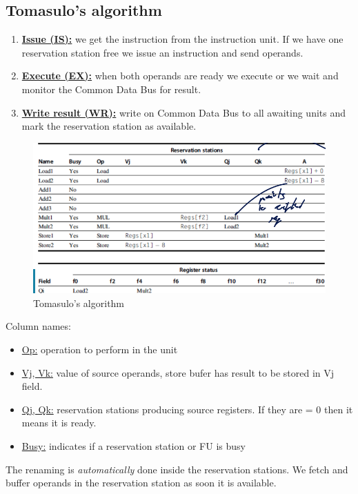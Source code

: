 \documentclass{report}
\begin{document}
\subsection{Tomasulo's algorithm}

\begin{enumerate}
    \item \underline{\textbf{Issue (IS):}} we get the instruction from the instruction unit. If we have one reservation station free we issue an instruction and send operands.
    \item \underline{\textbf{Execute (EX):}} when both operands are ready we execute or we wait and monitor the Common Data Bus for result.
    \item \underline{\textbf{Write result (WR):}} write on Common Data Bus to all awaiting  units and mark the reservation station as available.
\end{enumerate}

\begin{figure}[H]
    \centering
    \includegraphics[width=0.75\linewidth]{tomasulo_algo.png}
    \caption{Tomasulo's algorithm}
    \label{fig:tomasulo-label}
\end{figure}

Column names:

\begin{itemize}
    \item \underline{Op:} operation to perform in the unit
    \item \underline{Vj, Vk:} value of source operands, store bufer has result to be stored in Vj field.
    \item \underline{Qj, Qk:} reservation stations producing source registers. If they are = 0 then it means it is ready.
    \item \underline{Busy:} indicates if a reservation station or FU is busy
\end{itemize}

The renaming is \textit{automatically} done inside the reservation stations. We fetch and buffer operands in the reservation station as soon it is available.
\end{document}
